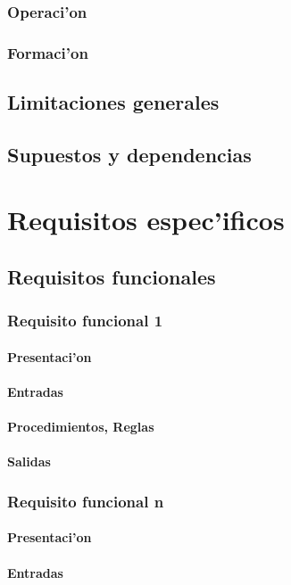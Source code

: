 \documentclass[letterpaper,openright,10pt,oneside]{report}
\begin{document}
			\subsection{Operaci'on}
			\subsection{Formaci'on}
		\section{Limitaciones generales}
		\section{Supuestos y dependencias}
	\chapter{Requisitos espec'ificos}
		\section{Requisitos funcionales}
			\subsection{Requisito funcional 1}
				\subsubsection{Presentaci'on}
				\subsubsection{Entradas}
				\subsubsection{Procedimientos, Reglas}
				\subsubsection{Salidas}
			\subsection{Requisito funcional n}
				\subsubsection{Presentaci'on}
				\subsubsection{Entradas}
\end{document}
